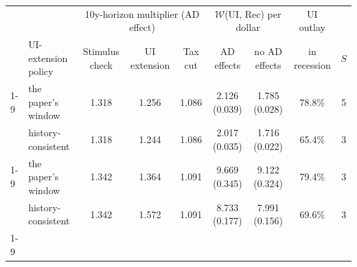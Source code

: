 \begin{tabular}{@{}llccccccc@{}}
\toprule
                  &                     & \multicolumn{3}{c}{10y-horizon multiplier (AD effect)} & \multicolumn{2}{c}{$\mathcal{W}$(UI, Rec) per dollar} & UI outlay    &     \\
                  & UI-extension policy & Stimulus check & UI extension & Tax cut & AD effects & no AD effects & in recession & $S$ \\ \cmidrule(l){1-9}
    \multirow{2}{*}{Baseline ($\rho_b = 0.7$, $\rho_{nb} = 0.5$)} & the paper's window & 1.318 & 1.256 & 1.086 & 2.126 (0.039) & 1.785 (0.028) & 78.8\% & 5 \\
                       & history-consistent & 1.318 & 1.244 & 1.086 & 2.017 (0.035) & 1.716 (0.022) & 65.4\% & 3 \\ \cmidrule(l){1-9}
    \multirow{2}{*}{Altern. ($\rho_b = 0.3$, $\rho_{nb} = 0.15$)} & the paper's window & 1.342 & 1.364 & 1.091 & 9.669 (0.345) & 9.122 (0.324) & 79.4\% & 3 \\
                       & history-consistent & 1.342 & 1.572 & 1.091 & 8.733 (0.177) & 7.991 (0.156) & 69.6\% & 3 \\ \cmidrule(l){1-9}
\end{tabular}

